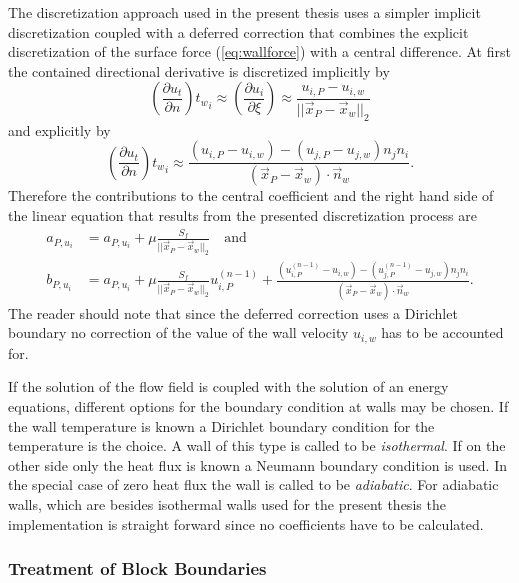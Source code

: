     The discretization approach used in the present thesis uses a simpler implicit discretization coupled with a deferred correction that combines the explicit discretization of the surface force (\ref{eq:wallforce}) with a central difference. At first the contained directional derivative is discretized implicitly by
    \begin{displaymath}
      \left(\frac{\partial u_t}{\partial n}\right) {t_w}_i
      \approx
      \left(\frac{\partial u_i}{\partial \xi}\right)
      \approx
      \frac{u_{i,P} - u_{i,w}}{|| \vec{x}_P - \vec{x}_w ||_2}
    \end{displaymath}
    and explicitly by
    \begin{displaymath}
      \left(\frac{\partial u_t}{\partial n}\right) {t_w}_i
      \approx
      \frac{\left(u_{i,P}- u_{i,w} \right) - \left(u_{j,P} - u_{j,w}\right) n_j n_i  }{\left( \vec{x}_P - \vec{x}_w \right) \cdot \vec{n}_w}.
    \end{displaymath}
    Therefore the contributions to the central coefficient and the right hand side of the linear equation that results from the presented discretization process are
    \begin{align*}
      a_{P,u_i} &= a_{P,u_i} + \mu \frac{S_f}{|| \vec{x}_P - \vec{x}_w ||_2} \quad \text{and} \\
      b_{P,u_i} &= a_{P,u_i} + \mu \frac{S_f}{|| \vec{x}_P - \vec{x}_w ||_2} u_{i,P}^{(n-1)} + 
      \frac{\left(u_{i,P}^{(n-1)}- u_{i,w} \right) - \left(u_{j,P}^{(n-1)} - u_{j,w}\right) n_j n_i  }{\left( \vec{x}_P - \vec{x}_w \right) \cdot \vec{n}_w}.
    \end{align*}
    The reader should note that since the deferred correction uses a Dirichlet boundary no correction of the value of the wall velocity \(u_{i,w}\) has to be accounted for.

    If the solution of the flow field is coupled with the solution of an energy equations, different options for the boundary condition at walls may be chosen. If the wall temperature is known a Dirichlet boundary condition for the temperature is the choice. A wall of this type is called to be \emph{isothermal}. If on the other side only the heat flux is known a Neumann boundary condition is used. In the special case of zero heat flux the wall is called to be \emph{adiabatic}. For adiabatic walls, which are besides isothermal walls used for the present thesis the implementation is straight forward since no coefficients have to be calculated.

  \subsubsection{Treatment of Block Boundaries}

